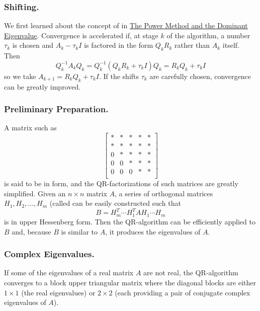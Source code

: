\documentclass{ximera}
\begin{document}
    
\subsubsection*{Shifting.} We first learned about the concept of  in \href{}{The Power Method and the Dominant Eigenvalue}.  Convergence is accelerated if, at stage $k$ of the algorithm, a number $\tau_{k}$ is chosen and $A_{k} - \tau_{k}I$ is factored in the form $Q_{k}R_{k}$ rather than $A_{k}$ itself. Then
\begin{equation*}
Q_{k}^{-1}A_{k}Q_{k} = Q_{k}^{-1}(Q_{k}R_{k} + \tau_{k}I)Q_{k} = R_{k}Q_{k} + \tau_{k}I
\end{equation*}
so we take $A_{k+1} = R_{k}Q_{k} + \tau_{k}I$. If the shifts $\tau_{k}$ are carefully chosen, convergence can be greatly improved.
    
\subsubsection*{Preliminary Preparation.} A matrix such as
\begin{equation*}
\left[ \begin{array}{rrrrr}
\ast  & \ast & \ast & \ast & \ast  \\
\ast  & \ast & \ast & \ast & \ast  \\
0  & \ast & \ast & \ast & \ast  \\
0  & 0 & \ast & \ast & \ast  \\
0  & 0 & 0 & \ast & \ast  \\
\end{array}\right]
\end{equation*}
is said to be in  form, and the QR-factorizations of such matrices are greatly simplified. Given an $n \times n$ matrix $A$, a series of orthogonal matrices $H_{1}, H_{2}, \dots, H_{m}$ (called  can be easily constructed such that
\begin{equation*}
B = H_{m}^T \cdots H_{1}^TAH_{1} \cdots H_{m}
\end{equation*}
is in upper Hessenberg form. Then the QR-algorithm can be efficiently applied to $B$ and, because $B$ is similar to $A$, it produces the eigenvalues of $A$.
    
\subsubsection*{Complex Eigenvalues.} If some of the eigenvalues of a real matrix $A$ are not real, the QR-algorithm converges to a block upper triangular matrix where the diagonal blocks are either $1 \times 1$ (the real eigenvalues) or $2 \times 2$ (each providing a pair of conjugate complex eigenvalues of $A$).
\end{document}
